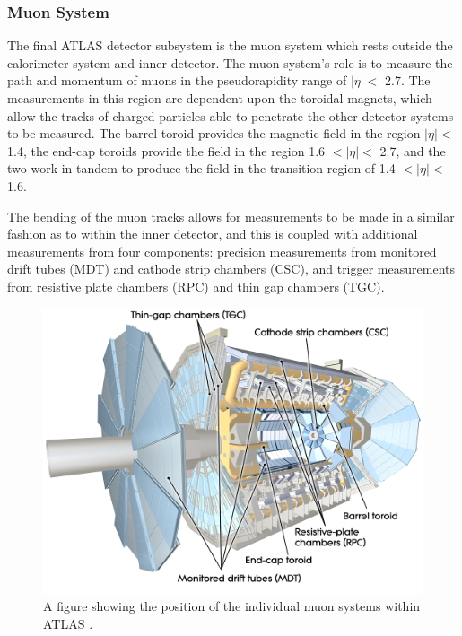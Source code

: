 \documentclass[12pt,a4paper,epsf,portrait,times,epsfig]{article}
\begin{document}
		\subsubsection{Muon System}
		
		The final ATLAS detector subsystem is the muon system which rests outside the calorimeter system and inner detector. The muon system’s role is to measure the path and momentum of muons in the pseudorapidity range of $|\eta| < $ 2.7. The measurements in this region are dependent upon the toroidal magnets, which allow the tracks of charged particles able to penetrate the other detector systems to be measured. The barrel toroid provides the magnetic field in the region $|\eta| <$ 1.4, the end-cap toroids provide the field in the region 1.6 $< |\eta| <$ 2.7, and the two work in tandem to produce the field in the transition region of 1.4 $< |\eta| <$ 1.6. \par
		
		The bending of the muon tracks allows for measurements to be made in a similar fashion	as to within the inner detector, and this is coupled with additional measurements from four components: precision measurements from monitored drift tubes (MDT) and cathode strip chambers (CSC), and trigger measurements from resistive plate chambers (RPC) and thin gap chambers (TGC).\par
		
		
		\begin{figure}
			\centering
			\includegraphics[scale=0.3]{Muon_System}
			\caption{A figure showing the position of the individual muon systems within ATLAS \cite{Article:ATLASDesignPaper}.}
			\label{Fig:MuonSystem}
		\end{figure}
		
\end{document}
